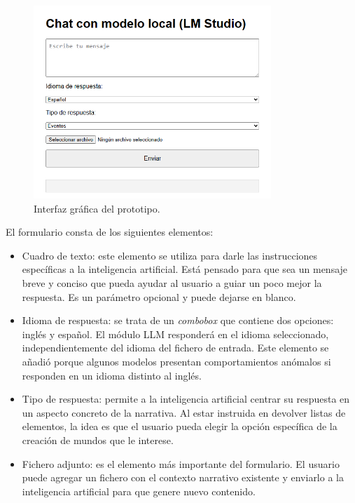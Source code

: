 \begin{figure}[htbp]
	\centering
	\includegraphics[width=0.8\textwidth]{./Figures/webpage.png}
	\caption{Interfaz gráfica del prototipo.}
	\label{fig:webPage}
\end{figure}

El formulario consta de los siguientes elementos:
\begin{itemize}
\item Cuadro de texto:
este elemento se utiliza para darle las instrucciones específicas a la inteligencia artificial.
Está pensado para que sea un mensaje breve y conciso que pueda ayudar al usuario a guiar un poco mejor la respuesta.
Es un parámetro opcional y puede dejarse en blanco.
\item Idioma de respuesta:
se trata de un \textit{combobox} que contiene dos opciones: inglés y español.
El módulo LLM responderá en el idioma seleccionado, independientemente del idioma del fichero de entrada.
Este elemento se añadió porque algunos modelos presentan comportamientos anómalos si responden en un idioma distinto al inglés.
\item Tipo de respuesta:
permite a la inteligencia artificial centrar su respuesta en un aspecto concreto de la narrativa.
Al estar instruida en devolver listas de elementos, la idea es que el usuario pueda elegir la opción
específica de la creación de mundos que le interese.
\item Fichero adjunto:
es el elemento más importante del formulario.
El usuario puede agregar un fichero con el contexto narrativo existente
y enviarlo a la inteligencia artificial para que genere nuevo contenido.
\end{itemize}

